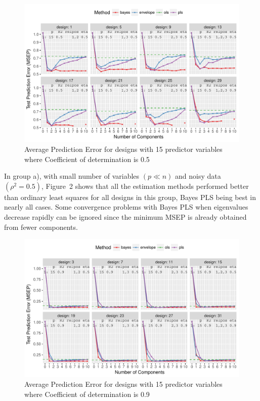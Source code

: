 \documentclass[num-refs]{wiley-article}
\begin{document}
\begin{figure}[!ht]
\centering
\includegraphics[width = \textwidth]{prediction-error-15-1.pdf}
\caption[Prediction Error - 1]{Average Prediction Error for designs with 15 predictor
variables where Coefficient of determination is 0.5}
\label{fig:pred-error-15-1}
\end{figure}

In group a), with small number of variables $(p \ll n)$ and noisy data
$(\rho^2 = 0.5)$, Figure~2 shows that all the estimation
methods performed better than ordinary least squares for all designs in this
group, Bayes PLS being best in nearly all cases. Some convergence problems with Bayes PLS when eigenvalues decrease rapidly
can be ignored since the minimum MSEP is already obtained from fewer components.


\begin{figure}[!ht]
\centering
\includegraphics[width = \textwidth]{prediction-error-15-2.pdf}
\caption[Prediction Error - 2]{Average Prediction Error for designs with 15 predictor
variables where Coefficient of determination is 0.9}
\label{fig:pred-error-15-2}
\end{figure}
\end{document}
